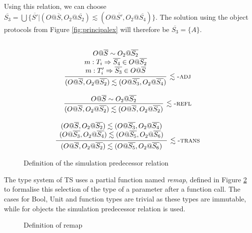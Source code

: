 \documentclass[preprint]{sigplanconf}
\makeatletter
\newcommand{\figref}[1]{Figure \ref{#1}}
\newcommand{\ot}[2]{#1@\overline{#2}}
\makeatother
\begin{document}
Using this relation, we can choose $\overline{S_3} = 
\bigcup \{ \overline{S'} | 
  (\ot{O}{S} , \ot{O_2}{S_2}) \lesssim (\ot{O}{S'}, \ot{O_2}{S_4})
\}$. The solution using the object protocols from \figref{fig:principalex}
will therefore be $\overline{S_3} = \{ A \}$.

\begin{figure}

\[
\begin{array}{c}
\\
\infer[\lesssim\textsc{-adj}]
  {(O@\overline{S}, O_2@\overline{S_2}) \lesssim (O@\overline{S_3}, O_2@\overline{S_4})}
  {
    \begin{array}{cc}
    O@\overline{S} \sim O_2@\overline{S_2}
    \\
    m : T_i \Rightarrow \overline{S_4} \in O@\overline{S_2}
    \\
    m : T_i' \Rightarrow \overline{S_3} \in O@\overline{S}
    \end{array}
  }
\\\\
\infer[\lesssim\textsc{-refl}]
  {(O@\overline{S}, O_2@\overline{S_2}) \lesssim (O@\overline{S}, O_2@\overline{S_2})}
  {O@\overline{S} \sim O_2@\overline{S_2}}
\\\\
\infer[\lesssim\textsc{-trans}]
  {
  (O@\overline{S}, O_2@\overline{S_2}) \lesssim (O@\overline{S_5}, O_2@\overline{S_6})
  }
  {
  \begin{array}{c}
  (O@\overline{S}, O_2@\overline{S_2}) \lesssim (O@\overline{S_3}, O_2@\overline{S_4})
  \\
  (O@\overline{S_3}, O_2@\overline{S_4}) \lesssim (O@\overline{S_5}, O_2@\overline{S_6})
  \end{array}
  }
\end{array}
\]
\caption{\label{fig:simreach} Definition of the simulation predecessor relation}
\end{figure}

The type system of TS uses a partial function named {\it remap}, defined in
\figref{fig:remaprules} to formalise
this selection of the type of a parameter after a function call. The cases
for Bool, Unit and function types are trivial as these types are immutable,
while for objects the simulation predecessor relation is used.

\begin{figure}
\ottdefnremap

\caption{\label{fig:remaprules} Definition of remap}
\end{figure}
\end{document}
